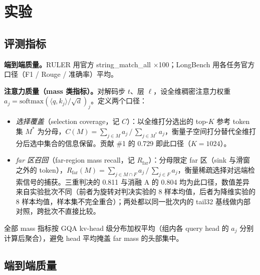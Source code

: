 \documentclass[11pt]{article}
\begin{document}
\section{实验}

\subsection{评测指标}

\textbf{端到端质量。}RULER 用官方 string\_match\_all $\times$100；LongBench 用各任务官方口径（F1 / Rouge / 准确率）平均。

\textbf{注意力质量（mass 类指标）。}对解码步 $t$、层 $\ell$，设全维稠密注意力权重 $a_j = \mathrm{softmax}(\langle q, k_j\rangle / \sqrt{d})_j$。定义两个口径：
\begin{itemize}
\item \emph{选择覆盖}（selection coverage，记 $C$）：以全维打分选出的 top-$K$ 参考 token 集 $M^\ast$ 为分母，$C(M) = \sum_{j \in M} a_j \,/\, \sum_{j \in M^\ast} a_j$，衡量子空间打分替代全维打分后选中集合的信息保留。贡献 \#1 的 0.729 即此口径（$K{=}1024$）。
\item \emph{far 区召回}（far-region mass recall，记 $R_{\mathrm{far}}$）：分母限定 far 区（sink 与滑窗之外的 token），$R_{\mathrm{far}}(M) = \sum_{j \in M \cap F} a_j \,/\, \sum_{j \in F} a_j$，衡量稀疏选择对远端检索信号的捕获。三重判决的 0.811 与消融 A 的 0.804 均为此口径，数值差异来自实验批次不同（前者为旋转对判决实验的 8 样本均值，后者为降维实验的 8 样本均值，样本集不完全重合）；两处都以同一批次内的 tail32 基线做内部对照，跨批次不直接比较。
\end{itemize}
全部 mass 指标按 GQA kv-head 级分布加权平均（组内各 query head 的 $a_j$ 分别计算后聚合），避免 head 平均掩盖 far mass 的头部集中。

\subsection{端到端质量}
\end{document}
